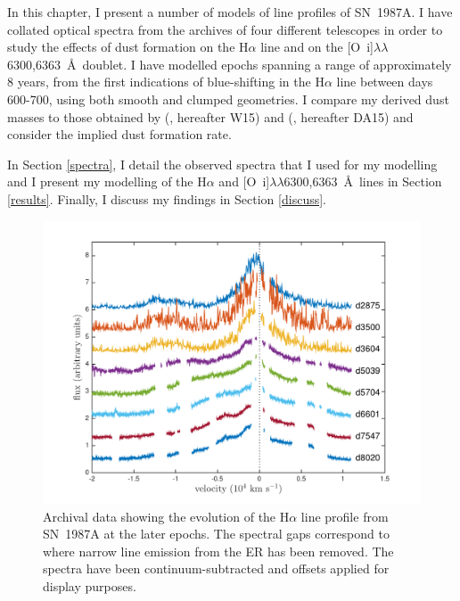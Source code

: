 In this chapter, I present a number of models of line profiles of SN~1987A. I have collated optical spectra from the archives of four different telescopes in order to study the effects of dust formation on 
the H$\alpha$ line and on the [O~{\sc i}]$\lambda\lambda$6300,6363~\AA\ doublet.  
I have modelled epochs spanning a range of approximately 8 years, from the first 
indications of blue-shifting in the H$\alpha$ line between days 600-700, using 
both smooth and clumped geometries.  I compare my derived dust masses to 
those obtained by (\citealt{Wesson2015}, hereafter W15) and (\citealt{Dwek2015}, hereafter DA15) and consider the implied dust formation rate. 

In Section \ref{spectra}, I detail the observed spectra that I used for 
my modelling and I present my modelling of the 
H$\alpha$ and [O~{\sc i}]$\lambda\lambda$6300,6363~\AA\ lines in 
Section \ref{results}.  Finally, I discuss my findings in Section 
\ref{discuss}.
    


\begin{figure}
\centering
\includegraphics[trim =45 10 45 15,clip=true,scale=0.7]{chapters/chapter5/images/Ha_evol_late_1col.pdf}
\caption{Archival data showing the evolution of the H$\alpha$
line profile from SN~1987A at the later epochs. The spectral gaps 
correspond to where narrow line emission from the ER has been 
removed. The spectra have been continuum-subtracted and offsets applied 
for display purposes.}
\label{Ha_evol_late}
\end{figure}


